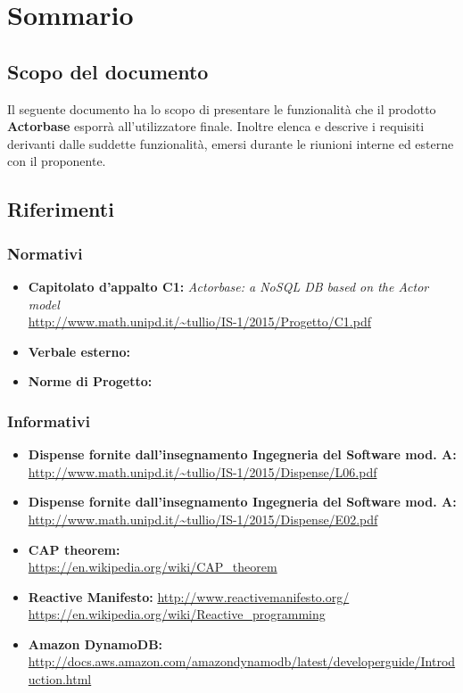 \documentclass{scalatekids-article}
\begin{document}
\section{Sommario}
\subsection{Scopo del documento}
Il seguente documento ha lo scopo di presentare le funzionalità che il prodotto
\textbf{Actorbase} esporrà all'utilizzatore finale. Inoltre elenca e descrive i
requisiti derivanti dalle suddette funzionalità, emersi durante le riunioni
interne ed esterne con il proponente.
\prodPurpose \glossExpl
\subsection{Riferimenti}
\subsubsection{Normativi}
\begin{itemize}
\item\textbf{Capitolato d'appalto C1:} \textit{Actorbase: a NoSQL DB based on the Actor model}\\
  \url{http://www.math.unipd.it/~tullio/IS-1/2015/Progetto/C1.pdf}
\item\textbf{Verbale esterno:} %
\item\textbf{Norme di Progetto:} %
\end{itemize}
\subsubsection{Informativi}
\begin{itemize}
\item\textbf{Dispense fornite dall'insegnamento Ingegneria del Software mod. A:}\\
  \url{http://www.math.unipd.it/~tullio/IS-1/2015/Dispense/L06.pdf}
\item\textbf{Dispense fornite dall'insegnamento Ingegneria del Software mod. A:}\\
  \url{http://www.math.unipd.it/~tullio/IS-1/2015/Dispense/E02.pdf}
\item\textbf{CAP theorem:}\\ %
  \url{https://en.wikipedia.org/wiki/CAP_theorem}
\item\textbf{Reactive Manifesto:}
  \url{http://www.reactivemanifesto.org/}
  \url{https://en.wikipedia.org/wiki/Reactive_programming}
\item\textbf{Amazon DynamoDB:}
  \url{http://docs.aws.amazon.com/amazondynamodb/latest/developerguide/Introduction.html}
\end{itemize}
\end{document}
